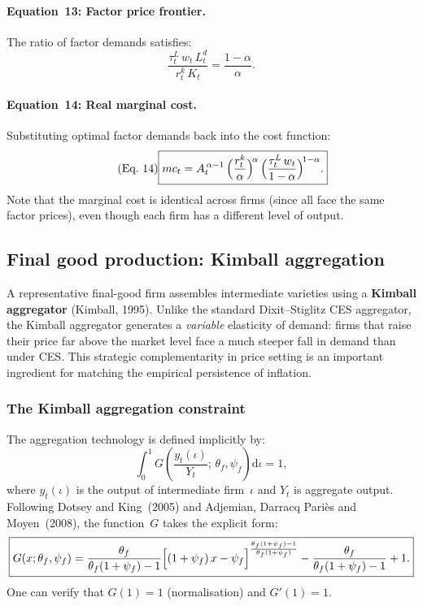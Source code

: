 \documentclass[11pt,a4paper]{article}
\newcommand{\dd}{\mathrm{d}}
\begin{document}
\paragraph{Equation~13: Factor price frontier.}
The ratio of factor demands satisfies:
\begin{equation}\label{eq:eq13}\tag{Eq.~13}
  \boxed{\frac{\tau^L_t\,w_t\,L^d_t}{r^k_t\,K_t} = \frac{1-\alpha}{\alpha}.}
\end{equation}

\paragraph{Equation~14: Real marginal cost.}
Substituting optimal factor demands back into the cost function:
\begin{equation}\label{eq:eq14}\tag{Eq.~14}
  \boxed{
  mc_t = A_t^{\,\alpha-1}\,
  \Bigl(\frac{r^k_t}{\alpha}\Bigr)^{\!\alpha}\,
  \Bigl(\frac{\tau^L_t\,w_t}{1-\alpha}\Bigr)^{\!1-\alpha}.}
\end{equation}
Note that the marginal cost is identical across firms (since all face the
same factor prices), even though each firm has a different level of output.

\subsection{Final good production: Kimball aggregation}

A representative final-good firm assembles intermediate varieties using a
\textbf{Kimball aggregator} (Kimball, 1995). Unlike the standard
Dixit--Stiglitz CES aggregator, the Kimball aggregator generates a
\emph{variable} elasticity of demand: firms that raise their price far
above the market level face a much steeper fall in demand than under CES.
This strategic complementarity in price setting is an important ingredient
for matching the empirical persistence of inflation.

\subsubsection{The Kimball aggregation constraint}

The aggregation technology is defined implicitly by:
\begin{equation}\label{eq:kimball_goods}
  \int_0^1 G\!\left(\frac{y_t(\iota)}{Y_t};\,\theta_f,\psi_f\right)\dd\iota = 1,
\end{equation}
where $y_t(\iota)$ is the output of intermediate firm~$\iota$ and $Y_t$ is
aggregate output. Following Dotsey and King~(2005) and
Adjemian, Darracq Pari\`es and Moyen~(2008), the function~$G$ takes the
explicit form:
\begin{equation}\label{eq:kimball_G}
  \boxed{
  G(x;\theta_f,\psi_f) = \frac{\theta_f}{\theta_f(1+\psi_f)-1}
  \Bigl[(1+\psi_f)\,x - \psi_f\Bigr]
    ^{\frac{\theta_f(1+\psi_f)-1}{\theta_f(1+\psi_f)}}
  - \frac{\theta_f}{\theta_f(1+\psi_f)-1} + 1.}
\end{equation}
One can verify that $G(1) = 1$ (normalisation) and $G'(1) = 1$.
\end{document}
